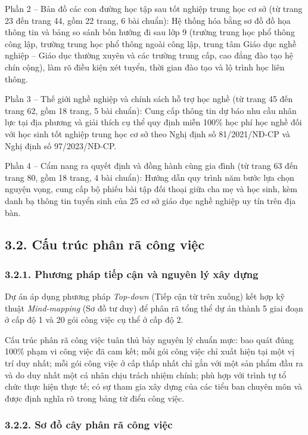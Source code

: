 Phần 2 -- Bản đồ các con đường học tập sau tốt nghiệp trung học cơ sở (từ trang 23 đến trang 44, gồm 22 trang, 6 bài chuẩn): Hệ thống hóa bằng sơ đồ đồ họa thông tin và bảng so sánh bốn hướng đi sau lớp 9 (trường trung học phổ thông công lập, trường trung học phổ thông ngoài công lập, trung tâm Giáo dục nghề nghiệp -- Giáo dục thường xuyên và các trường trung cấp, cao đẳng đào tạo hệ chín cộng), làm rõ điều kiện xét tuyển, thời gian đào tạo và lộ trình học liên thông.

Phần 3 -- Thế giới nghề nghiệp và chính sách hỗ trợ học nghề (từ trang 45 đến trang 62, gồm 18 trang, 5 bài chuẩn): Cung cấp thông tin dự báo nhu cầu nhân lực tại địa phương và giải thích cụ thể quy định miễn 100\% học phí học nghề đối với học sinh tốt nghiệp trung học cơ sở theo Nghị định số 81/2021/NĐ-CP và Nghị định số 97/2023/NĐ-CP.

Phần 4 -- Cẩm nang ra quyết định và đồng hành cùng gia đình (từ trang 63 đến trang 80, gồm 18 trang, 4 bài chuẩn): Hướng dẫn quy trình năm bước lựa chọn nguyện vọng, cung cấp bộ phiếu bài tập đối thoại giữa cha mẹ và học sinh, kèm danh bạ thông tin tuyển sinh của 25 cơ sở giáo dục nghề nghiệp uy tín trên địa bàn.

\subsection*{3.2. Cấu trúc phân rã công việc}

\subsubsection*{3.2.1. Phương pháp tiếp cận và nguyên lý xây dựng}

Dự án áp dụng phương pháp \textit{Top-down} (Tiếp cận từ trên xuống) kết hợp kỹ thuật \textit{Mind-mapping} (Sơ đồ tư duy) để phân rã tổng thể dự án thành 5 giai đoạn ở cấp độ 1 và 20 gói công việc cụ thể ở cấp độ 2.

Cấu trúc phân rã công việc tuân thủ bảy nguyên lý chuẩn mực: bao quát đúng 100\% phạm vi công việc đã cam kết; mỗi gói công việc chỉ xuất hiện tại một vị trí duy nhất; mỗi gói công việc ở cấp thấp nhất chỉ gắn với một sản phẩm đầu ra và do duy nhất một cá nhân chịu trách nhiệm chính; phù hợp với trình tự tổ chức thực hiện thực tế; có sự tham gia xây dựng của các tiểu ban chuyên môn và được định nghĩa rõ trong bảng từ điển công việc.

\subsubsection*{3.2.2. Sơ đồ cây phân rã công việc}

